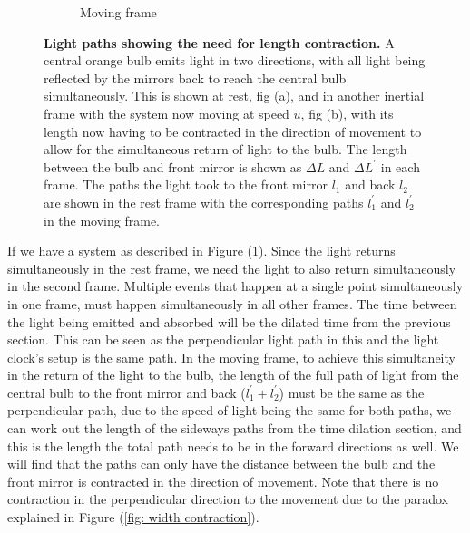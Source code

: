 \begin{figure}[H]
\begin{subfigure}{.49\textwidth}
		\caption{Moving frame}
	\end{subfigure}
	\caption{\textbf{Light paths showing the need for length contraction.} A central orange bulb emits light in two directions, with all light being reflected by the mirrors back to reach the central bulb simultaneously. This is shown at rest, fig (a), and in another inertial frame with the system now moving at speed ${u}$, fig (b), with its length now having to be contracted in the direction of movement to allow for the simultaneous return of light to the bulb. The length between the bulb and front mirror is shown as ${\Delta L}$ and ${\Delta L^{'}}$ in each frame. The paths the light took to the front mirror ${l_1}$ and back ${l_2}$ are shown in the rest frame with the corresponding paths ${l^{'}_1}$ and ${l^{'}_2}$ in the moving frame.}
	\label{fig: length contraction math}
\end{figure}

If we have a system as described in Figure (\ref{fig: length contraction math}).
Since the light returns simultaneously in the rest frame, we need the light to also return simultaneously in the second frame.
Multiple events that happen at a single point simultaneously in one frame, must happen simultaneously in all other frames.
The time between the light being emitted and absorbed will be the dilated time from the previous section.
This can be seen as the perpendicular light path in this and the light clock's setup is the same path.
In the moving frame, to achieve this simultaneity in the return of the light to the bulb, the length of the full path of light from the central bulb to the front mirror and back (${l^{'}_1} + {l^{'}_2}$) must be the same as the perpendicular path, due to the speed of light being the same for both paths, we can work out the length of the sideways paths from the time dilation section, and this is the length the total path needs to be in the forward directions as well.
We will find that the paths can only have the distance between the bulb and the front mirror is contracted in the direction of movement.
Note that there is no contraction in the perpendicular direction to the movement due to the paradox explained in Figure (\ref{fig: width contraction}).

